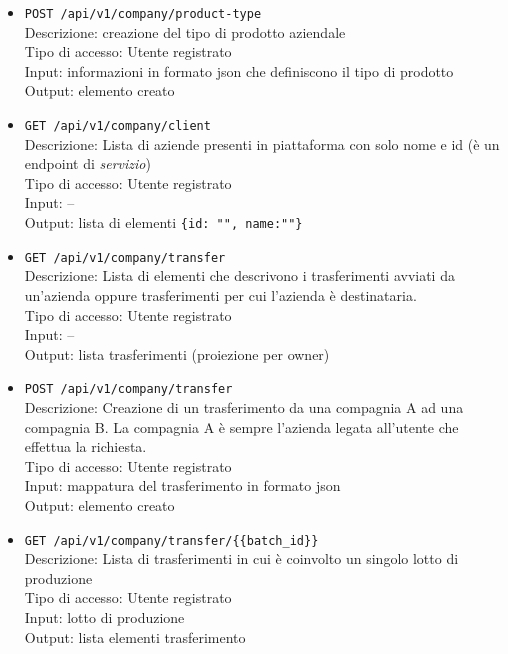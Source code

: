 \documentclass[a4paper,11pt]{article}
\begin{document}
\begin{itemize}
  \item \texttt{POST /api/v1/company/product-type}
        \\ Descrizione: creazione del tipo di prodotto aziendale
        \\ Tipo di accesso:  Utente registrato
        \\ Input: informazioni in formato json che definiscono il tipo di prodotto
        \\ Output: elemento creato

  \item \texttt{GET /api/v1/company/client}
        \\ Descrizione: Lista di aziende presenti in piattaforma con solo nome e id (è un endpoint di \textit{servizio})
        \\ Tipo di accesso: Utente registrato
        \\ Input: --
        \\ Output: lista di elementi \texttt{\{id: "", name:""\}}

  \item \texttt{GET /api/v1/company/transfer}
        \\ Descrizione: Lista di elementi che descrivono i trasferimenti avviati da un'azienda oppure trasferimenti per cui l'azienda è destinataria.
        \\ Tipo di accesso: Utente registrato
        \\ Input: --
        \\ Output: lista trasferimenti (proiezione per owner)

  \item \texttt{POST /api/v1/company/transfer}
        \\ Descrizione: Creazione di un trasferimento da una compagnia A ad una compagnia B. La compagnia A è sempre l'azienda legata all'utente che effettua la richiesta.
        \\ Tipo di accesso: Utente registrato
        \\ Input: mappatura del trasferimento in formato json
        \\ Output: elemento creato

  \item \texttt{GET /api/v1/company/transfer/\{\{batch\_id\}\}}
        \\ Descrizione: Lista di trasferimenti in cui è coinvolto un singolo lotto di produzione
        \\ Tipo di accesso: Utente registrato
        \\ Input: lotto di produzione
        \\ Output: lista elementi trasferimento


\end{itemize}
\end{document}
